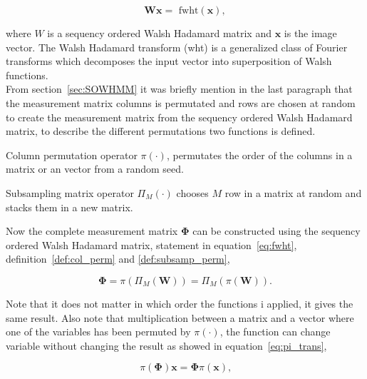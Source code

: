 \begin{equation}
\mathbf{W}\mathbf{x} = \text{ fwht}(\mathbf{x}),
\label{eq:fwht}
\end{equation}

where $W$ is a sequency ordered Walsh Hadamard matrix and $\mathbf{x}$ is the image vector. The Walsh Hadamard transform (wht) is a generalized class of Fourier transforms which decomposes the input vector into superposition of Walsh functions.\\[0.1in]

From section~\ref{sec:SOWHMM} it was briefly mention in the last paragraph that the measurement matrix columns is permutated and rows are chosen at random to create the measurement matrix from the sequency ordered Walsh Hadamard matrix, to describe the different permutations two functions is defined.\\[0.1in] 

\theoremstyle{definition}
\begin{definition}{Column permutation operator}
$\pi(\cdot)$, permutates the order of the columns in a matrix or an vector from a random seed.
\label{def:col_perm}
\end{definition}

\theoremstyle{definition}
\begin{definition}{Subsampling matrix operator}
$\Pi_M(\cdot)$ chooses $M$ row in a matrix at random and stacks them in a new matrix.
\label{def:subsamp_perm}
\end{definition}


Now the complete measurement matrix $\mathbf{\Phi}$ can be constructed using the sequency ordered Walsh Hadamard matrix, statement in equation~\ref{eq:fwht}, definition~\ref{def:col_perm} and \ref{def:subsamp_perm},


\begin{equation}
\mathbf{\Phi} = \pi(\Pi_M(\mathbf{W})) = \Pi_M(\pi(\mathbf{W}))\text{.}
\end{equation}

Note that it does not matter in which order the functions i applied, it gives the same result. Also note that multiplication between a matrix and a vector where one of the variables has been permuted by $\pi(\cdot)$, the function can change variable without changing the result as showed in equation~\ref{eq:pi_trans},

\begin{equation}
\pi(\mathbf{\Phi})\mathbf{x} = \mathbf{\Phi}\pi(\mathbf{x})\text{,}
\label{eq:pi_trans}
\end{equation}


